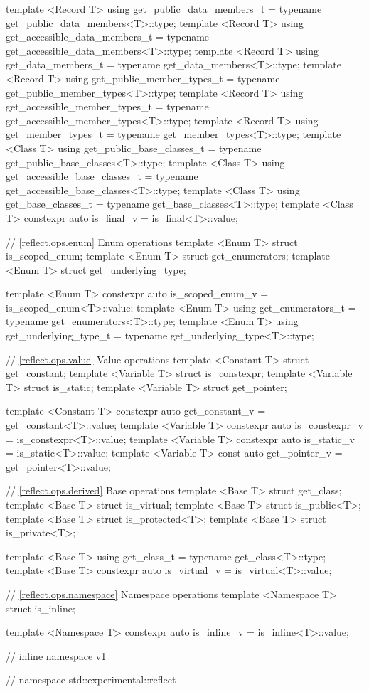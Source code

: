 \begin{std.txt}
\begin{codeblock}
{{template <Record T>
  using get_public_data_members_t = typename get_public_data_members<T>::type;
template <Record T>
  using get_accessible_data_members_t = typename get_accessible_data_members<T>::type;
template <Record T>
  using get_data_members_t = typename get_data_members<T>::type;
template <Record T>
  using get_public_member_types_t = typename get_public_member_types<T>::type;
template <Record T>
  using get_accessible_member_types_t = typename get_accessible_member_types<T>::type;
template <Record T>
  using get_member_types_t = typename get_member_types<T>::type;
template <Class T>
  using get_public_base_classes_t = typename get_public_base_classes<T>::type;
template <Class T>
  using get_accessible_base_classes_t = typename get_accessible_base_classes<T>::type;
template <Class T>
  using get_base_classes_t = typename get_base_classes<T>::type;
template <Class T>
  constexpr auto is_final_v = is_final<T>::value;

// \ref{reflect.ops.enum} Enum operations
template <Enum T> struct is_scoped_enum;
template <Enum T> struct get_enumerators;
template <Enum T> struct get_underlying_type;

template <Enum T>
  constexpr auto is_scoped_enum_v = is_scoped_enum<T>::value;
template <Enum T>
  using get_enumerators_t = typename get_enumerators<T>::type;
template <Enum T>
  using get_underlying_type_t = typename get_underlying_type<T>::type;

// \ref{reflect.ops.value} Value operations
template <Constant T> struct get_constant;
template <Variable T> struct is_constexpr;
template <Variable T> struct is_static;
template <Variable T> struct get_pointer;

template <Constant T>
  constexpr auto get_constant_v = get_constant<T>::value;
template <Variable T>
  constexpr auto is_constexpr_v = is_constexpr<T>::value;
template <Variable T>
  constexpr auto is_static_v = is_static<T>::value;
template <Variable T>
  const auto get_pointer_v = get_pointer<T>::value;

// \ref{reflect.ops.derived} Base operations
template <Base T> struct get_class;
template <Base T> struct is_virtual;
template <Base T> struct is_public<T>;
template <Base T> struct is_protected<T>;
template <Base T> struct is_private<T>;

template <Base T>
  using get_class_t = typename get_class<T>::type;
template <Base T>
  constexpr auto is_virtual_v = is_virtual<T>::value;

// \ref{reflect.ops.namespace} Namespace operations
template <Namespace T> struct is_inline;

template <Namespace T>
  constexpr auto is_inline_v = is_inline<T>::value;

} // inline namespace v1
} // namespace std::experimental::reflect
\end{codeblock}
\end{std.txt}

